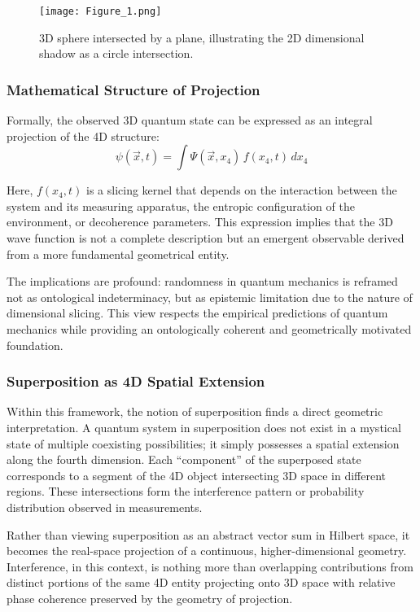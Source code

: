 \documentclass[12pt]{article}
\begin{document}
\begin{figure}[htbp]
    \centering
    \texttt{[image: Figure\_1.png]}
    \caption{3D sphere intersected by a plane, illustrating the 2D dimensional shadow as a circle intersection.}
    \label{fig:sphere_plane_intersection}
\end{figure}
\newpage
\subsubsection*{Mathematical Structure of Projection}

Formally, the observed 3D quantum state can be expressed as an integral projection of the 4D structure:
\begin{equation}
\psi(\vec{x}, t) = \int \Psi(\vec{x}, x_4) \, f(x_4, t) \, dx_4
\end{equation}

Here, $f(x_4, t)$ is a slicing kernel that depends on the interaction between the system and its measuring apparatus, the entropic configuration of the environment, or decoherence parameters. This expression implies that the 3D wave function is not a complete description but an emergent observable derived from a more fundamental geometrical entity.

The implications are profound: randomness in quantum mechanics is reframed not as ontological indeterminacy, but as epistemic limitation due to the nature of dimensional slicing. This view respects the empirical predictions of quantum mechanics while providing an ontologically coherent and geometrically motivated foundation.

\subsubsection*{Superposition as 4D Spatial Extension}

Within this framework, the notion of superposition finds a direct geometric interpretation. A quantum system in superposition does not exist in a mystical state of multiple coexisting possibilities; it simply possesses a spatial extension along the fourth dimension. Each “component” of the superposed state corresponds to a segment of the 4D object intersecting 3D space in different regions. These intersections form the interference pattern or probability distribution observed in measurements.

Rather than viewing superposition as an abstract vector sum in Hilbert space, it becomes the real-space projection of a continuous, higher-dimensional geometry. Interference, in this context, is nothing more than overlapping contributions from distinct portions of the same 4D entity projecting onto 3D space with relative phase coherence preserved by the geometry of projection.
\end{document}

